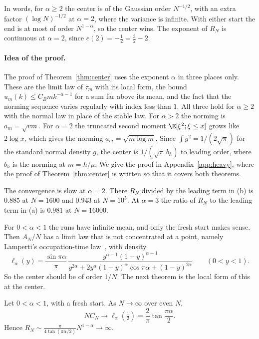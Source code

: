 In words, for $\alpha\ge2$ the center is of the Gaussian order $N^{-1/2}$,
with an extra factor $(\log N)^{-1/2}$ at $\alpha=2$, where the variance is
infinite. With either start the end is at most of order $N^{1-\alpha}$, so
the center wins. The
exponent of $R_N$ is continuous at $\alpha=2$, since
$e(2)=-\frac12=\frac32-2$.

\paragraph{Idea of the proof.}
The proof of Theorem~\ref{thm:center} uses the exponent $\alpha$ in three
places only. These are the limit law of $\tau_m$ with its local form, the
bound $u_m(k)\le C_Bmk^{-\alpha-1}$ for a sum far above its mean, and the
fact that the norming sequence varies regularly with index less than $1$. All
three hold for $\alpha\ge2$ with the normal law in place of the stable law.
For $\alpha>2$ the norming is $a_m=\sqrt{vm}$. For $\alpha=2$ the truncated
second moment $\E[\xi^2;\xi\le x]$ grows like $2\log x$, which gives the
norming $a_m=\sqrt{m\log m}$. Since $\int g^2=1/(2\sqrt\pi)$ for the standard
normal density $g$, the center is $1/(\sqrt\pi\,b_h)$ to leading order, where
$b_h$ is the norming at $m=h/\mu$. We give the proof in
Appendix~\ref{app:heavy}, where the proof of Theorem~\ref{thm:center} is
written so that it covers both theorems.

The convergence is slow at $\alpha=2$. There $R_N$ divided by the leading
term in (b) is $0.885$ at $N=1600$ and $0.943$ at $N=10^5$. At $\alpha=3$
the ratio of $R_N$ to the leading term in (a) is $0.981$ at $N=16000$.

For $0<\alpha<1$ the runs have infinite mean, and only the fresh start makes
sense. Then $A_N/N$ has a limit law that is not concentrated at a point,
namely Lamperti's occupation-time
law~\cite{lamperti1958,godrecheluck2001}, with density
\[
 \ell_\alpha(y)=\frac{\sin\pi\alpha}{\pi}\,
 \frac{y^{\alpha-1}(1-y)^{\alpha-1}}{y^{2\alpha}+2y^\alpha(1-y)^\alpha
 \cos\pi\alpha+(1-y)^{2\alpha}}\qquad(0<y<1).
\]
So the center should be of order $1/N$. The next theorem is the local form
of this at the center.

\begin{theorem}[$0<\alpha<1$]\label{thm:lamperti}
Let $0<\alpha<1$, with a fresh start. As $N\to\infty$ over even $N$,
\[
 NC_N\to\ell_\alpha(\tfrac12)=\frac2\pi\tan\frac{\pi\alpha}2 .
\]
Hence $R_N\sim\frac{\pi}{4\tan(\pi\alpha/2)}N^{1-\alpha}\to\infty$.
\end{theorem}


